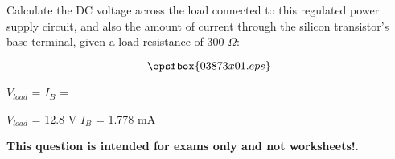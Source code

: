 

Calculate the DC voltage across the load connected to this regulated power supply circuit, and also the amount of current through the silicon transistor's base terminal, given a load resistance of 300 $\Omega$:

$$\epsfbox{03873x01.eps}$$

$V_{load}$ = \hskip 80pt $I_B$ = 







$V_{load}$ = 12.8 V \hskip 50pt $I_B$ = 1.778 mA 







{\bf This question is intended for exams only and not worksheets!}.



